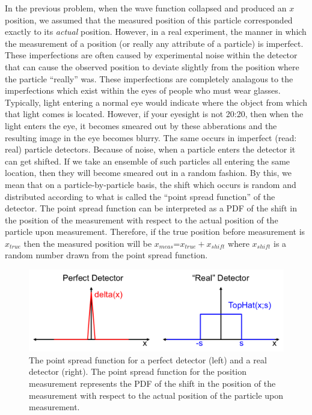\documentclass[12pt]{article}
\begin{document}
In the previous problem, when the wave function collapsed and produced an $x$ position, we assumed that the measured position of this particle corresponded exactly to its \textit{actual} position.  However, in a real experiment, the manner in which the measurement of a position (or really any attribute of a particle) is imperfect.  These imperfections are often caused by experimental noise within the detector that can cause the observed position to deviate slightly from the position where the particle ``really'' was.  These imperfections are completely analagous to the imperfections which exist within the eyes of people who must wear glasses.  Typically, light entering a normal eye would indicate where the object from which that light comes is located.  However, if your eyesight is not 20:20, then when the light enters the eye, it becomes smeared out by these abberations and the resulting image in the eye becomes blurry.  The same occurs in imperfect (read: real) particle detectors.  Because of noise, when a particle enters the detector it can get shifted.  If we take an ensemble of such particles all entering the same location, then they will become smeared out in a random fashion.  By this, we mean that on a particle-by-particle basis, the shift which occurs is random and distributed according to what is called the ``point spread function'' of the detector.    The point spread function can be interpreted as a PDF of the shift in the position of the measurement with respect to the actual position of the particle upon measurement.  Therefore, if the true position before measurement is $x_{true}$ then the measured position will be $x_{meas}$=$x_{true}+x_{shift}$ where $x_{shift}$ is a random number drawn from the point spread function.
\begin{figure}[h!]
  \center
  \includegraphics[width=0.8\linewidth]{detector.png}
  \caption{The point spread function for a perfect detector (left) and a real detector (right).  The point spread function for the position measurement represents the PDF of the shift in the position of the measurement with respect to the actual position of the particle upon measurement.}
  \label{fig:riemann}
\end{figure}
\end{document}

